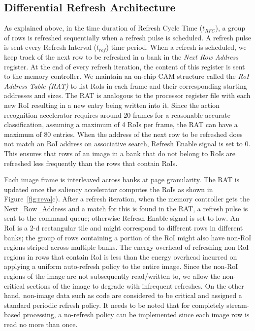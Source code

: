 \subsection{Differential Refresh Architecture}
As explained above, in the time duration of Refresh Cycle Time ($t_{RFC}$), a group of rows is refreshed sequentially when a refresh pulse is scheduled. A refresh pulse is sent every Refresh Interval ($t_{ref}$) time period.  When a refresh is scheduled, we keep track of the next row to be refreshed in a bank in the \emph{Next Row Address} register. At the end of every refresh iteration, the content of this register is sent to the memory controller. 
We maintain an on-chip CAM structure called the \emph{RoI Address Table (RAT)} to list RoIs in each frame and their corresponding starting addresses and sizes. The RAT is analogous to the processor register file with each new RoI resulting in a new entry being written into it. Since the action recognition accelerator requires around 20 frames for a reasonable accurate classification, assuming a maximum of 4 RoIs per frame, the RAT can have a maximum of 80 entries. When the address of the next row to be refreshed does not match an RoI address on associative search, Refresh Enable signal is set to 0. This ensures that rows of an image in a bank that do not belong to RoIs are refreshed less frequently than the rows that contain RoIs. 

Each image frame is interleaved across banks at page granularity. The RAT is updated once the saliency accelerator computes the RoIs as shown in Figure~\ref{fig:reva}c). After a refresh iteration, when the memory controller gets the Next\_Row\_Address and a match for this is found in the RAT, a refresh pulse is sent to the command queue; otherwise Refresh Enable signal is set to low. An RoI is a 2-d rectangular tile and might correspond to different rows in different banks; the group of rows containing a portion of the RoI might also have non-RoI regions striped across multiple banks. The energy overhead of refreshing non-RoI regions in rows that contain RoI is less than the energy overhead incurred on applying a uniform auto-refresh policy to the entire image. Since the non-RoI regions of the image are not subsequently read/written to, we allow the non-critical sections of the image to degrade with infrequent refreshes. On the other hand, non-image data such as code are considered to be critical and assigned a standard periodic refresh policy. It needs to be noted that for completely stream-based processing, a no-refresh policy can be implemented since each image row is read no more than once.
 
